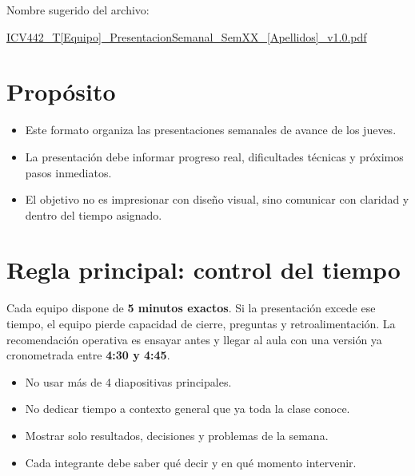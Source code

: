 \documentclass[11pt]{article}
\begin{document}

\begin{infobox}
Nombre sugerido del archivo:

\url{ICV442_T[Equipo]_PresentacionSemanal_SemXX_[Apellidos]_v1.0.pdf}
\end{infobox}

\section{Prop\'osito}
\begin{itemize}
\item Este formato organiza las presentaciones semanales de avance de los jueves.
\item La presentaci\'on debe informar progreso real, dificultades t\'ecnicas y pr\'oximos pasos inmediatos.
\item El objetivo no es impresionar con dise\~no visual, sino comunicar con claridad y dentro del tiempo asignado.
\end{itemize}

\section{Regla principal: control del tiempo}
\begin{warnbox}
Cada equipo dispone de \textbf{5 minutos exactos}. Si la presentaci\'on excede ese tiempo, el equipo pierde capacidad de cierre, preguntas y retroalimentaci\'on. La recomendaci\'on operativa es ensayar antes y llegar al aula con una versi\'on ya cronometrada entre \textbf{4:30 y 4:45}.
\end{warnbox}

\begin{itemize}
\item No usar m\'as de 4 diapositivas principales.
\item No dedicar tiempo a contexto general que ya toda la clase conoce.
\item Mostrar solo resultados, decisiones y problemas de la semana.
\item Cada integrante debe saber qu\'e decir y en qu\'e momento intervenir.
\end{itemize}
\end{document}

